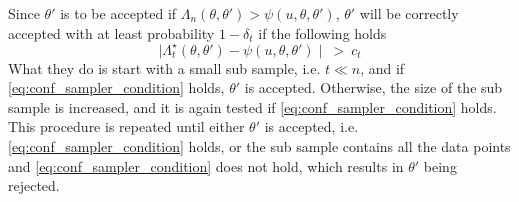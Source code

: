 \documentclass{article}
\theoremstyle{definition}
\begin{document}
Since $\theta'$ is to be accepted if $\Lambda_n\left(\theta, \theta'\right) > \psi\left(u, \theta, \theta'\right)$,  $\theta'$ will be correctly accepted with at least probability $1 - \delta_t$ if  the following holds 
\begin{equation}\label{eq:conf_sampler_condition}
    \mid\Lambda_t^{\star}\left(\theta, \theta'\right) - \psi\left(u, \theta, \theta'\right)\mid \:>\: c_t
\end{equation} What they do is start with a small sub sample, i.e. $t \ll n$, and if \eqref{eq:conf_sampler_condition} holds, $\theta'$ is accepted. Otherwise, the size of the sub sample is increased, and it is again tested if \eqref{eq:conf_sampler_condition} holds. This procedure is repeated until either $\theta'$ is accepted, i.e. \eqref{eq:conf_sampler_condition} holds, or the sub sample contains all the data points and \eqref{eq:conf_sampler_condition} does not hold, which results in $\theta'$ being rejected. 
\end{document}
